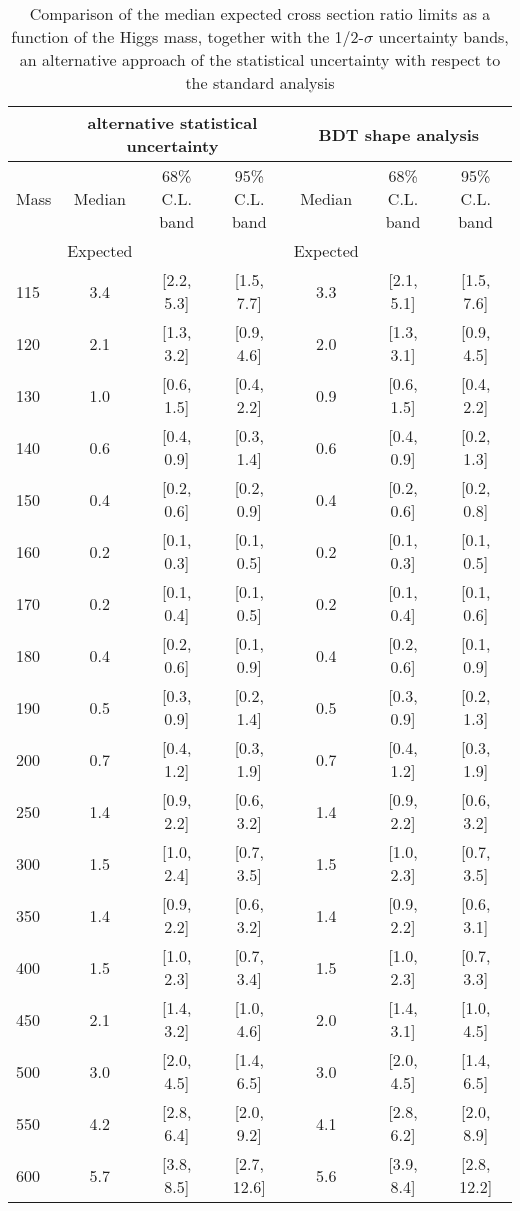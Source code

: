 \begin{table}[!ht]
\begin{center}
{\normalsize
\begin{tabular}{|l|c|c|c|c|c|c|}
\hline
      &  \multicolumn{3}{c|}{alternative statistical uncertainty} &\multicolumn{3}{c|}{BDT shape analysis} \\
\hline
Mass  &  Median      &     68\% C.L. band &  95\% C.L. band &  Median	   &	 68\% C.L. band &  95\% C.L. band\\
      &  Expected    &                    &                 &  Expected    &			&		 \\
\hline
115 &  3.4 & [2.2, 5.3] & [1.5, 7.7]  &  3.3 & [2.1, 5.1] & [1.5, 7.6] \\
120 &  2.1 & [1.3, 3.2] & [0.9, 4.6]  &  2.0 & [1.3, 3.1] & [0.9, 4.5] \\
130 &  1.0 & [0.6, 1.5] & [0.4, 2.2]  &  0.9 & [0.6, 1.5] & [0.4, 2.2] \\
140 &  0.6 & [0.4, 0.9] & [0.3, 1.4]  &  0.6 & [0.4, 0.9] & [0.2, 1.3] \\
150 &  0.4 & [0.2, 0.6] & [0.2, 0.9]  &  0.4 & [0.2, 0.6] & [0.2, 0.8] \\
160 &  0.2 & [0.1, 0.3] & [0.1, 0.5]  &  0.2 & [0.1, 0.3] & [0.1, 0.5] \\
170 &  0.2 & [0.1, 0.4] & [0.1, 0.5]  &  0.2 & [0.1, 0.4] & [0.1, 0.6] \\
180 &  0.4 & [0.2, 0.6] & [0.1, 0.9]  &  0.4 & [0.2, 0.6] & [0.1, 0.9] \\
190 &  0.5 & [0.3, 0.9] & [0.2, 1.4]  &  0.5 & [0.3, 0.9] & [0.2, 1.3] \\
200 &  0.7 & [0.4, 1.2] & [0.3, 1.9]  &  0.7 & [0.4, 1.2] & [0.3, 1.9] \\
250 &  1.4 & [0.9, 2.2] & [0.6, 3.2]  &  1.4 & [0.9, 2.2] & [0.6, 3.2] \\
300 &  1.5 & [1.0, 2.4] & [0.7, 3.5]  &  1.5 & [1.0, 2.3] & [0.7, 3.5] \\
350 &  1.4 & [0.9, 2.2] & [0.6, 3.2]  &  1.4 & [0.9, 2.2] & [0.6, 3.1] \\
400 &  1.5 & [1.0, 2.3] & [0.7, 3.4]  &  1.5 & [1.0, 2.3] & [0.7, 3.3] \\
450 &  2.1 & [1.4, 3.2] & [1.0, 4.6]  &  2.0 & [1.4, 3.1] & [1.0, 4.5] \\
500 &  3.0 & [2.0, 4.5] & [1.4, 6.5]  &  3.0 & [2.0, 4.5] & [1.4, 6.5] \\
550 &  4.2 & [2.8, 6.4] & [2.0, 9.2]  &  4.1 & [2.8, 6.2] & [2.0, 8.9] \\
600 &  5.7 & [3.8, 8.5] & [2.7, 12.6] &  5.6 & [3.9, 8.4] & [2.8, 12.2]\\
\hline
\end{tabular}
}
\caption{Comparison of the median expected cross section ratio limits as a function 
of the Higgs mass, together with the 1/2-$\sigma$ uncertainty bands, an alternative 
approach of the statistical uncertainty with respect to the standard analysis}
\label{tab:mva_shapealtstat}
\end{center}
\end{table}
